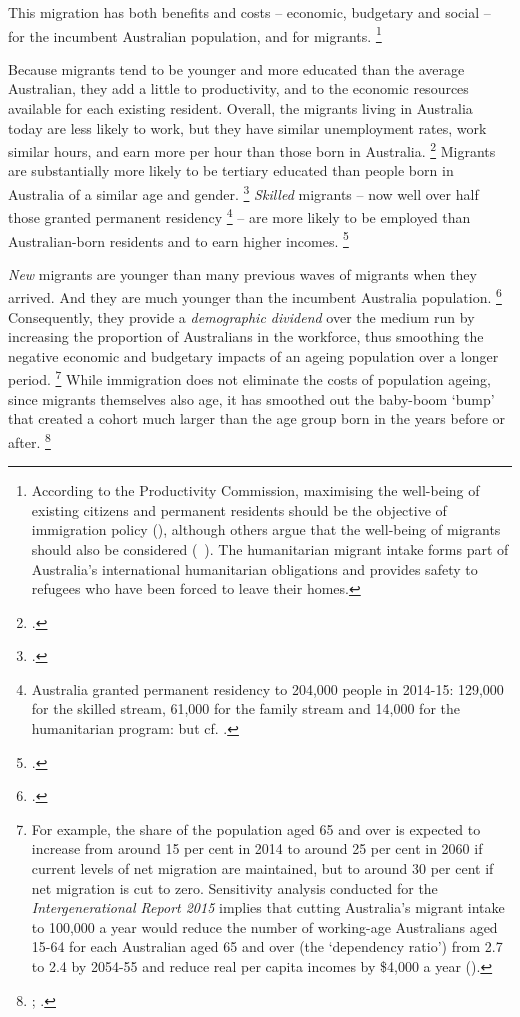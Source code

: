 This migration has both benefits and costs -- economic, budgetary and social -- for the incumbent Australian population, and for migrants.%
	\footnote{According to the Productivity Commission, maximising the well-being of existing citizens and permanent residents should be the objective of immigration policy  (\textcite[][91]{CommissionMigrantIntake2016}), although others argue that the well-being of migrants should also be considered (\eg~\textcite{Westland2017Rejoinder}). The humanitarian migrant intake forms part of Australia's international humanitarian obligations and provides safety to refugees who have been forced to leave their homes.} 

Because migrants tend to be younger and more educated than the average Australian, they add a little to productivity, and to the economic resources available for each existing resident.
Overall, the migrants living in Australia today are less likely to work, but they have similar unemployment rates, work similar hours, and earn more per hour than those born in Australia.%
	\footcite[][147--175]{CommissionMigrantIntake2016}
Migrants are substantially more likely to be tertiary educated than people born in Australia of a similar age and gender.%
	\footcite[][132]{CommissionMigrantIntake2016}
\emph{Skilled} migrants -- now well over half those granted permanent residency%
    \footnote{Australia granted permanent residency to 204,000 people in 2014-15: 129,000 for the skilled stream, 61,000 for the family stream and 14,000 for the humanitarian program: \textcite[][23]{CommissionMigrantIntake2016} but cf. \textcite[][69]{CommissionMigrantIntake2016}.}
-- are more likely to be employed than Australian-born residents and to earn higher incomes.%
	\footcite[][10]{CommissionMigrantIntake2016}

\emph{New} migrants are younger than many previous waves of migrants when they arrived. And they are much younger than the incumbent Australia population.%
    \footcites[][125]{CommissionMigrantIntake2016}[][Graph~5]{Ellis2017Kellyspeech}
Consequently, they provide a \emph{demographic dividend} over the medium run by increasing the proportion of Australians in the workforce, thus smoothing the negative economic and budgetary impacts of an ageing population over a longer period.%
	\footnote{For example, the share of the population aged 65 and over is expected to increase from around 15 per cent in 2014 to around 25 per cent in 2060 if current levels of net migration are maintained, but to around 30 per cent if net migration is cut to zero.
    Sensitivity analysis conducted for the \emph{Intergenerational Report 2015} implies that cutting Australia's migrant intake to 100,000 a year would reduce the number of working-age Australians aged 15-64 for each Australian aged 65 and over (the `dependency ratio') from 2.7 to 2.4 by 2054-55 and reduce real per capita incomes by \$4,000 a year (\textcite[][Tables~A.1 and~B.2]{Hockey2015IGR}).}
While immigration does not eliminate the costs of population ageing, since migrants themselves also age, it has smoothed out the baby-boom `bump' that created a cohort much larger than the age group born in the years before or after.%
	\footnote{\textcite{NortonTanner2017GenY}; .}

